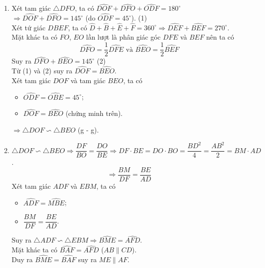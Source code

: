 \begin{bt}
{\begin{center}
\end{center}
\begin{enumerate}
	\item Xét tam giác $ \triangle DFO $, ta có $ \widehat{DOF} +\widehat{DFO}+ \widehat{ODF} = 180^\circ$ \\
	 $\Rightarrow \widehat{DOF}+ \widehat{DFO}=145^\circ $ (do $ \widehat{ODF}=45^\circ $). \hfill (1) \\
	 Xét tứ giác $ DBEF $, ta có $ \widehat{D}+\widehat{B}+\widehat{E}+\widehat{F}=360^\circ \Rightarrow \widehat{DEF}+ \widehat{BEF}=270^\circ$.\\ Mặt khác ta có $ FO $, $ EO $ lần lượt là phân giác góc $ DFE $ và $ BEF $ nên ta có
	 $$ \widehat{DFO}=\dfrac{1}{2} \widehat{DFE} \text{ và } \widehat{BEO}=\dfrac{1}{2}\widehat{BEF}$$
	 Suy ra $ \widehat{DFO}+\widehat{BEO}=145^\circ $ \hfill (2)\\
	 Từ (1) và (2) suy ra $ \widehat{DOF} =\widehat{BEO} $.\\
	 Xét tam giác $ DOF $ và tam giác $ BEO $, ta có
	 \begin{itemize}
	 	\item $ \widehat{ODF}=\widehat{OBE}=45^\circ $;
	 	\item $ \widehat{DOF} =\widehat{BEO} $ (chứng minh trên).
	 \end{itemize}
 $\Rightarrow \triangle DOF \backsim \triangle BEO $ (g - g). 
\item $ \triangle DOF \backsim \triangle BEO \Rightarrow \dfrac{DF}{BO}=\dfrac{DO}{BE}  \Rightarrow DF \cdot BE = DO \cdot BO =\dfrac{BD^2}{4}=\dfrac{AB^2}{2} = BM \cdot AD$.
$$ \Rightarrow  \dfrac{BM}{DF} = \dfrac{BE}{AD} $$
Xét tam giác $ ADF $ và $ EBM $, ta có
\begin{itemize}
	\item $ \widehat{ADF}=\widehat{MBE} $;
	\item $ \dfrac{BM}{DF} = \dfrac{BE}{AD} $.
\end{itemize}
Suy ra $ \triangle ADF \backsim \triangle EBM  \Rightarrow \widehat{BME}=\widehat{AFD}$.\\
Mặt khác ta có $ \widehat{BAF}=\widehat{AFD} $  ($ AB \parallel CD $).\\
Duy ra $ \widehat{BME}= \widehat{BAF} $ suy ra $ ME \parallel AF$.
\end{enumerate}}
\end{bt}

